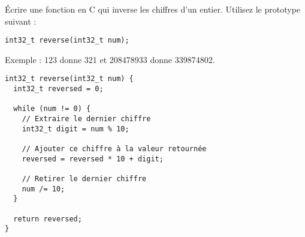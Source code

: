\documentclass[french,a4paper,addpoints,11pt]{exam}
\begin{document}
\begin{questions}

\question Écrire une fonction en C qui inverse les chiffres d'un entier. Utilisez le prototype suivant :

\begin{lstlisting}
int32_t reverse(int32_t num);
\end{lstlisting}

Exemple : 123 donne 321 et 208478933 donne 339874802.

\ifprintanswers
\begin{solution}
\begin{lstlisting}
int32_t reverse(int32_t num) {
  int32_t reversed = 0;

  while (num != 0) {
    // Extraire le dernier chiffre
    int32_t digit = num % 10;

    // Ajouter ce chiffre à la valeur retournée
    reversed = reversed * 10 + digit;

    // Retirer le dernier chiffre
    num /= 10;
  }

  return reversed;
}
\end{lstlisting}
\end{solution}
\else
\fillwithdottedlines{10cm}
\fi


\end{questions}
\end{document}
